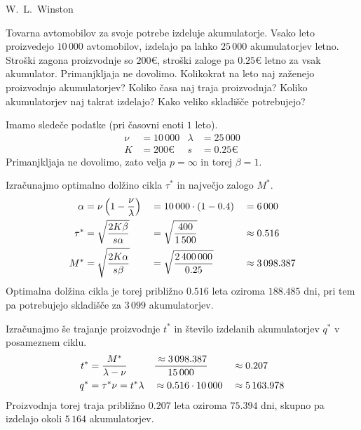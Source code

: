 \begin{naloga}{W.~L.~Winston}{\cite[\S15, Example~5]{w}}
\begin{vprasanje}
Tovarna avtomobilov za svoje potrebe izdeluje akumulatorje.
Vsako leto proizvedejo $10\,000$ avtomobilov,
izdelajo pa lahko $25\,000$ akumulatorjev letno.
Stroški zagona proizvodnje so $200 €$,
stroški zaloge pa $0.25 €$ letno za vsak akumulator.
Primanjkljaja ne dovolimo.
Kolikokrat na leto naj zaženejo proizvodnjo akumulatorjev?
Koliko časa naj traja proizvodnja?
Koliko akumulatorjev naj takrat izdelajo?
Kako veliko skladišče potrebujejo?
\end{vprasanje}

\begin{odgovor}
Imamo sledeče podatke (pri časovni enoti $1$ leto).
\begin{align*}
\nu &= 10\,000 &
\lambda &= 25\,000 \\
K &= 200 € &
s &= 0.25 €
\end{align*}
Primanjkljaja ne dovolimo, zato velja $p = \infty$ in torej $\beta = 1$.

Izračunajmo optimalno dolžino cikla $\tau^*$
in največjo zalogo $M^*$.
\begin{alignat*}{3}
\alpha &= \nu \left(1 - {\nu \over \lambda}\right)
&&= 10\,000 \cdot (1 - 0.4) &&= 6\,000 \\
\tau^* &= \sqrt{2K \beta \over s \alpha}
&&= \sqrt{400 \over 1\,500} &&\approx 0.516 \\
M^* &= \sqrt{2K \alpha \over s \beta}
&&= \sqrt{2\,400\,000 \over 0.25} &&\approx 3\,098.387
\end{alignat*}
Optimalna dolžina cikla je torej približno $0.516$ leta
oziroma $188.485$ dni,
pri tem pa potrebujejo skladišče za $3\,099$ akumulatorjev.

Izračunajmo še trajanje proizvodnje $t^*$
in število izdelanih akumulatorjev $q^*$ v posameznem ciklu.
\begin{alignat*}{3}
t^* &= {M^* \over \lambda - \nu}
&&\approx 3\,098.387 \over 15\,000 &&\approx 0.207 \\
q^* &= \tau^* \nu = t^* \lambda
&&\approx 0.516 \cdot 10\,000 &&\approx 5\,163.978
\end{alignat*}
Proizvodnja torej traja približno $0.207$ leta
oziroma $75.394$ dni,
skupno pa izdelajo okoli $5\,164$ akumulatorjev.
\end{odgovor}
\end{naloga}
